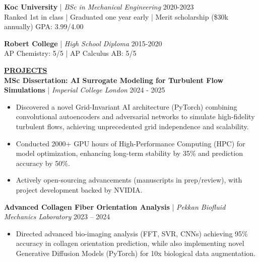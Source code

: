 \documentclass{article}
\newlength{\remaining}
\renewcommand{\section}[1]{
  \vspace{1.0em}\setlength{\remaining}{\textwidth-\widthof{\uppercase{#1}}}
    \noindent\underline{\fontsize{10}{15}\bfseries\uppercase{#1}\hspace*{\remaining}} \\
}
\renewcommand{\subsection}[3]{
    \noindent\textbf{#1} | \emph{#2} \hfill #3  
}
\begin{document}
    \vspace{0.25em}

    \subsection{Koc University}{BSc in Mechanical Engineering}{2020-2023} \\
    Ranked 1st in class | Graduated one year early | Merit scholarship (\$30k annually) \hfill GPA: 3.99/4.00

    \vspace{0.25em}

    \subsection{Robert College}{High School Diploma}{2015-2020} \\
    AP Chemistry: 5/5 | AP Calculus AB: 5/5

    \section{Projects}
    \subsection{MSc Dissertation: AI Surrogate Modeling for Turbulent Flow Simulations}{Imperial College London}{2024 - 2025} 
    \begin{itemize} 
        \item Discovered a novel Grid-Invariant AI architecture (PyTorch) combining convolutional autoencoders and adversarial networks to simulate high-fidelity turbulent flows, achieving unprecedented grid independence and scalability.
        \item Conducted 2000+ GPU hours of High-Performance Computing (HPC) for model optimization, enhancing long-term stability by 35\% and prediction accuracy by 50\%.
        \item Actively open-sourcing advancements (manuscripts in prep/review), with project development backed by NVIDIA.
    \end{itemize}

    \subsection{Advanced Collagen Fiber Orientation Analysis}{Pekkan Biofluid Mechanics Laboratory}{2023 – 2024}
    \begin{itemize}
        \item Directed advanced bio-imaging analysis (FFT, SVR, CNNs) achieving 95\% accuracy in collagen orientation prediction, while also implementing novel Generative Diffusion Models (PyTorch) for 10x biological data augmentation.
    \end{itemize}
\end{document}
